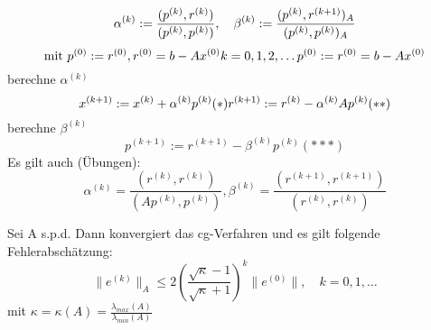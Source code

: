 \begin{algorithmus}
  \[
    \alpha^{(k)} := \frac{(p^{(k)},r^{(k)})}{(p^{(k)},p^{(k)})},\quad
    \beta^{(k)} := \frac{(p^{(k)},r^{(k+1)})_A}{(p^{(k)},p^{(k)})_A}\\
  \]
  \[
    \text{mit } p^{(0)}:=r^{(0)}, r^{(0)}=b-Ax^{(0)}
    k=0,1,2,\ldots\\
    p^{(0)}:= r^{(0)} = b-Ax^{(0)}\\
  \]
  berechne $\alpha^{(k)}$
  \[
    x^{(k+1)}:=x^{(k)}+\alpha^{(k)}p^{(k)}\\ (*)
    r^{(k+1)}:=r^{(k)} -\alpha^{(k)}Ap^{(k)} (**)
  \]
  berechne $\beta^{(k)}$
  \[
    p^{(k+1)}:=r^{(k+1)}-\beta^{(k)}p^{(k)} (***)
  \]
  Es gilt auch (Übungen):
  \[
    \alpha^{(k)} = \frac{(r^{(k)},r^{(k)})}{(Ap^{(k)},p^{(k)})}, \beta^{(k)}=\frac{(r^{(k+1)},r^{(k+1)})}{(r^{(k)},r^{(k)})}
  \]
\end{algorithmus}

\begin{satz}[1.3.3]
  Sei A s.p.d. Dann konvergiert das cg-Verfahren und es gilt folgende Fehlerabschätzung:
  \[
    \|e^{(k)}\|_A \leq 2 \left( \frac{\sqrt{\kappa}-1}{\sqrt{\kappa}+1} \right)^k \|e^{(0)}\|, \quad k=0,1,\ldots
  \]
  mit $\kappa = \kappa(A) = \frac{\lambda_{max}(A)}{\lambda_{min}(A)}$
\end{satz}

